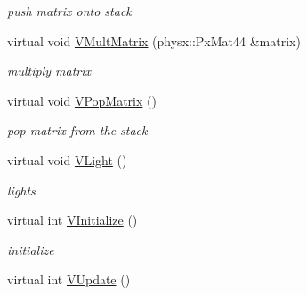 \begin{DoxyCompactItemize}
\begin{DoxyCompactList}\small\item\em push matrix onto stack \item\end{DoxyCompactList}\item 
\hypertarget{classPlatform_1_1Render_a24454be20e87d167c2f34c39de21ecaa}{
virtual void \hyperlink{classPlatform_1_1Render_a24454be20e87d167c2f34c39de21ecaa}{VMultMatrix} (physx::PxMat44 \&matrix)}
\label{classPlatform_1_1Render_a24454be20e87d167c2f34c39de21ecaa}

\begin{DoxyCompactList}\small\item\em multiply matrix \item\end{DoxyCompactList}\item 
\hypertarget{classPlatform_1_1Render_ab1721a3b16f57fb9148e61f184184a72}{
virtual void \hyperlink{classPlatform_1_1Render_ab1721a3b16f57fb9148e61f184184a72}{VPopMatrix} ()}
\label{classPlatform_1_1Render_ab1721a3b16f57fb9148e61f184184a72}

\begin{DoxyCompactList}\small\item\em pop matrix from the stack \item\end{DoxyCompactList}\item 
\hypertarget{classPlatform_1_1Render_a5ef8fd92ffccef2eedd6b5c71a16e5cf}{
virtual void \hyperlink{classPlatform_1_1Render_a5ef8fd92ffccef2eedd6b5c71a16e5cf}{VLight} ()}
\label{classPlatform_1_1Render_a5ef8fd92ffccef2eedd6b5c71a16e5cf}

\begin{DoxyCompactList}\small\item\em lights \item\end{DoxyCompactList}\item 
\hypertarget{classPlatform_1_1Render_a47cd2a6a2ff9c387e7bf4bec1db9f55f}{
virtual int \hyperlink{classPlatform_1_1Render_a47cd2a6a2ff9c387e7bf4bec1db9f55f}{VInitialize} ()}
\label{classPlatform_1_1Render_a47cd2a6a2ff9c387e7bf4bec1db9f55f}

\begin{DoxyCompactList}\small\item\em initialize \item\end{DoxyCompactList}\item 
\hypertarget{classPlatform_1_1Render_af3a6b8fef8ea0647e1ff67d2766016f1}{
virtual int \hyperlink{classPlatform_1_1Render_af3a6b8fef8ea0647e1ff67d2766016f1}{VUpdate} ()}
\label{classPlatform_1_1Render_af3a6b8fef8ea0647e1ff67d2766016f1}


\end{DoxyCompactItemize}

